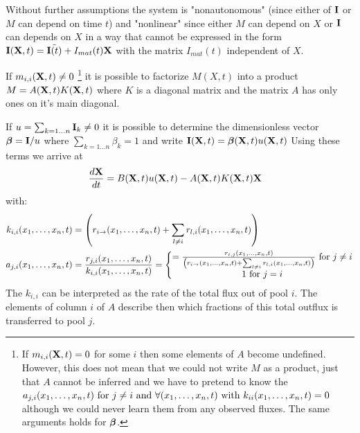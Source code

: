 Without further assumptions the system is "nonautonomous" (since either of $\mathbf{I}$ or $M$ can depend on time $t$) 
and "nonlinear" since either $M$ can depend on $X$ or $\mathbf{I}$ can depends on $X$ in a way that cannot be expressed in the form $\mathbf{I}(\mathbf{X},t)=\tilde{\mathbf{I}(t)}+I_{mat}(t)\mathbf{X}$ with the matrix $I_{mat}(t)$ independent of $X$.

If $m_{i,i}(\mathbf{X},t) \ne 0$ 
\footnote{
  If $m_{i,i}(\mathbf{X},t) = 0 $ for some $i$ then some elements of $A$ become
  undefined. However, this does not mean that we could not write $M$ as a
  product, just that $A$ cannot be inferred and we have to pretend to know the
  $a_{j,i}(x_1, \dots, x_n, t) \text{ for } j\ne i \text{ and } \forall (x_1, \dots, x_n, t) \text{ with }
  k_{ii}(x_1, \dots, x_n, t)=0 $ although we could never learn them from any observed fluxes.
  The same arguments holds for $\bm{\beta}$.
}
it is possible to factorize $M(X,t)$ into a product $M=A(\mathbf{X},t) K(\mathbf{X},t)$ where $K$ is
a diagonal matrix and the matrix $A$ has only ones on it's main diagonal. 

If $u=\sum_{k=1\dots n} \mathbf{I}_k \ne 0$ it is possible to determine the dimensionless vector $\bm{\beta} = \mathbf{I}/u$ where $\sum_{k=1\dots n} \beta_k =1$ and write $\mathbf{I}(\mathbf{X},t)=\bm{\beta}(\mathbf{X},t)u(\mathbf{X},t)$ 
Using these terms  we arrive at 
\begin{align*}
\frac{d \mathbf{X}}{d t}&=B(\mathbf{X},t) u(\mathbf{X},t) - A(\mathbf{X},t) K(\mathbf{X},t) \mathbf{X}   
\end{align*}
\newcommand{\kiixt}{
      \left(
      r_{i \rightarrow } \xnt
      + 
      \sum_{l \ne i} r_{l,i} \xnt
      \right)
}
with:
\begin{align}
  k_{i,i}\xnt &=\kiixt \nonumber
  \\
  a_{j,i}\xnt
  &=\frac{r_{j,i}\xnt}{k_{i,i}\xnt}=
  \left\{
  \begin{matrix}
    =\frac{
    r_{i,j}\xnt 
  }{
    \kiixt
  } \text{ for } j \ne i
  \\
  1 \text{ for } j=i
  \end{matrix}
  \right.
  \label{aij}
\end{align}
The $k_{i,i}$ can be interpreted as the rate of the total flux out of pool $i$. The elements of column $i$ of $A$ describe then which fractions of this total outflux is transferred to pool $j$. 

